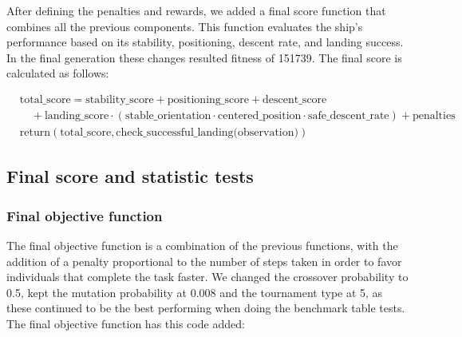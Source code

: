 \documentclass[a4paper, 12pt, fleqn]{report}
\begin{document}
    \noindent
    After defining the penalties and rewards, we added a final score function that combines all the previous components. This function evaluates the ship's performance based on its stability, positioning, descent rate, and landing success. In the final generation these changes resulted fitness of 151739. The final score is calculated as follows:
    {\scriptsize
    \begin{center}
    \begin{align*}
        & \text{total\_score} =
          \text{stability\_score} +
          \text{positioning\_score} +
          \text{descent\_score} \\
        & \quad + \text{landing\_score} \cdot
          (\text{stable\_orientation} \cdot \text{centered\_position} \cdot \text{safe\_descent\_rate}) +
          \text{penalties} \\
        & \text{return}(\text{total\_score}, \text{check\_successful\_landing(observation)})
        \end{align*}
        \end{center}
    }



        \newpage
        \subsection*{Final score and statistic tests}

        \subsubsection*{Final objective function}

        The final objective function is a combination of the previous functions, with the addition of a penalty proportional to the number of steps taken in order to favor individuals that complete the task faster. We changed the crossover probability to 0.5, kept the mutation probability at 0.008 and the tournament type at 5, as these continued to be the best performing when doing the benchmark table tests.
        The final objective function has this code added:
\end{document}
